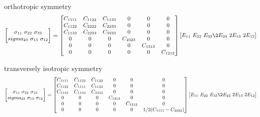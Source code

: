 \documentclass[
  letterpaper,
  ignorenonframetext,
  aspectratio=43,
  handout,
  12pt]{beamer}
\begin{document}
\begin{frame}{orthotropic symmetry}
\protect\hypertarget{orthotropic-symmetry}{}
\[\small \begin{bmatrix}
  \sigma_{11}\ \sigma_{22} \ \sigma_{33} \\sigma_{23} \ \sigma_{13} \ \sigma_{12}
  \end{bmatrix}
  = \begin{bmatrix}
  C_{1111} & C_{1122} & C_{1133} & 0 & 0 & 0 \\
  C_{1122} & C_{2222} & C_{2233} & 0 & 0 & 0 \\
  C_{1133} & C_{2233} & C_{3333} & 0 & 0 & 0 \\
  0 & 0 & 0 & C_{2323} & 0 & 0 \\
  0 & 0 & 0 & 0 & C_{1313} & 0 \\
  0 & 0 & 0 & 0 & 0 & C_{1212}
  \end{bmatrix}\begin{bmatrix}
  E_{11}\ E_{22} \ E_{33} \2E_{23} \ 2E_{13} \ 2E_{12}
\end{bmatrix}\]
\end{frame}

\begin{frame}{transversely isotropic symmetry}
\protect\hypertarget{transversely-isotropic-symmetry}{}
\[\small \begin{bmatrix}
  \sigma_{11}\ \sigma_{22} \ \sigma_{33} \\sigma_{23} \ \sigma_{13} \ \sigma_{12}
  \end{bmatrix}
  = \begin{bmatrix}
  C_{1111} & C_{1122} & C_{1133} & 0 & 0 & 0 \\
  C_{1122} & C_{1111} & C_{1133} & 0 & 0 & 0 \\
  C_{1133} & C_{1133} & C_{3333} & 0 & 0 & 0 \\
  0 & 0 & 0 & C_{1313} & 0 & 0 \\
  0 & 0 & 0 & 0 & C_{1313} & 0 \\
  0 & 0 & 0 & 0 & 0 & 1/2(C_{1111}-C_{2222})
  \end{bmatrix}\begin{bmatrix}
  E_{11}\ E_{22} \ E_{33} \2E_{23} \ 2E_{13} \ 2E_{12}
\end{bmatrix}\]
\end{frame}
\end{document}
